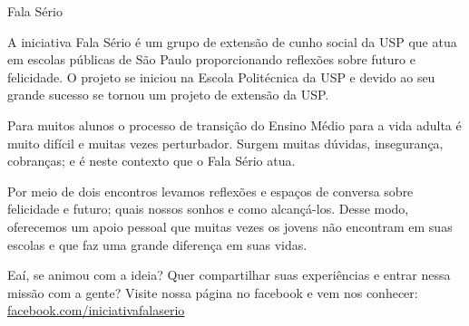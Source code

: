 \begin{secao}{Fala Sério}


A iniciativa Fala Sério é um grupo de extensão de cunho social da USP que atua em
escolas públicas de São Paulo proporcionando reflexões sobre futuro e felicidade.
O projeto se iniciou na Escola Politécnica da USP e devido ao seu grande sucesso 
se tornou um projeto de extensão da USP.

Para muitos alunos o processo de transição do Ensino Médio para a vida adulta é 
muito difícil e muitas vezes perturbador. Surgem muitas dúvidas, insegurança, 
cobranças; e é neste contexto que o Fala Sério atua.

Por meio de dois encontros levamos reflexões e espaços de conversa sobre 
felicidade e futuro; quais nossos sonhos e como alcançá-los. Desse modo, 
oferecemos um apoio pessoal que muitas vezes os jovens não encontram em suas 
escolas e que faz uma grande diferença em suas vidas.

Eaí, se animou com a ideia? Quer compartilhar suas experiências e entrar nessa 
missão com a gente? Visite nossa página no facebook e vem nos conhecer:
\url{facebook.com/iniciativafalaserio}

\end{secao}
